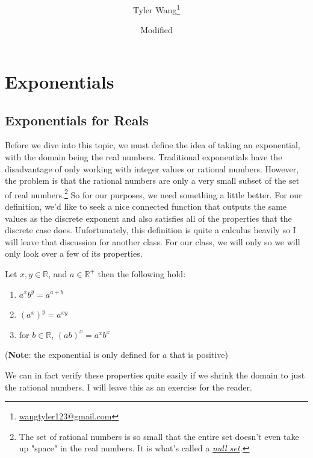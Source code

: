 \documentclass[11pt]{article}
\title{\mytitle \\ [2ex] \Large \mysubtitle}
\date{\small Modified \mydate}
\author {Tyler Wang\thanks{
\href{mailto:wangtyler123@gmail.com}{wangtyler123@gmail.com}}}
\numberwithin{lemma}{section}
\numberwithin{equation}{section}
\numberwithin{define}{section}
\numberwithin{prop}{section}
\numberwithin{figure}{section}
\numberwithin{theorem}{section}
\numberwithin{cor}{section}
\newcounter{ex}[section]
\numberwithin{ex}{section}
\def\real{\mathbb{R}}
\begin{document}
\maketitle
\section{Exponentials}
\subsection{Exponentials for Reals}
Before we dive into this topic, we must define the idea of taking an exponential, with the domain being the real numbers. Traditional exponentials have the disadvantage of only working with integer values or rational numbers. 
However, the problem is that the rational numbers are only a very small subset of the set of real numbers.\footnote{
The set of rational numbers is so small that the entire set doesn't even take up "space" in the real numbers. It is what's called a \textit{\href{https://en.wikipedia.org/wiki/Null_set}{null set}.}}
So for our purposes, we need something a little better. 
For our definition, we'd like to seek a nice connected function that outputs the same values as the discrete exponent and also satisfies all of the properties that the discrete case does.
Unfortunately, this definition is quite a calculus heavily so I will leave that discussion for another class. For our class, we will only so we will only look over a few of its properties.
\begin{theorem}
Let $x,y\in\real$, and $a\in\real^{+}$ then the following hold:
\begin{enumerate}
	\item $a^xb^y=a^{a+b}$
	\item $(a^x)^y=a^{xy}$
	\item for $b\in\real$, $(ab)^x=a^xb^x$
\end{enumerate}
(\textbf{Note}: the exponential is only defined for $a$ that is positive)
\end{theorem}

We can in fact verify these properties quite easily if we shrink the domain to just the rational numbers. I will leave this as an exercise for the reader.

\begin{figure}[h]
	\centering
	\caption{}
	\label{fig:exp}
\end{figure}
\end{document}
